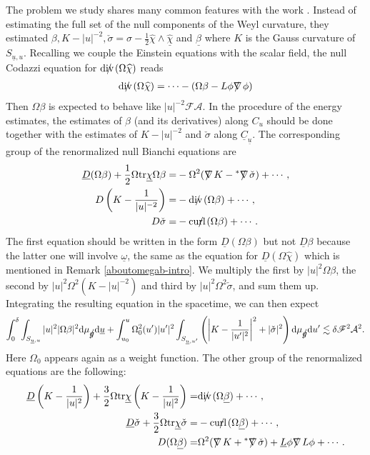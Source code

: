 \documentclass[11pt,reqno]{amsart}
\theoremstyle{definition}
\numberwithin{equation}{section}
\newcommand{\D}{\mathrm{d}}
\newcommand{\tr}{\mathrm{tr}}
\def\betab{\underline{\beta}}
\def\chib{\underline{\chi}}
\def\chibh{\widehat{\underline{\chi}}}
\def\chih{\widehat{\chi}}
\def\Lb{\underline{L}}
\def\tr{\mathrm{tr}}
\def\omegab{\underline{\omega}}
\def\ub{\underline{u}}
\def\Cb{\underline{C}}
\newcommand{\Db}{\underline{D}}
\def\nablas{\mbox{$\nabla \mkern -13mu /$ }}
\def\divs{\mbox{$\mathrm{div} \mkern -13mu /$ }}
\def\curls{\mbox{$\mathrm{curl} \mkern -13mu /$ }}
\def\gs{\mbox{$g \mkern -9mu /$}}
\begin{document}
The problem we study shares many common features with the work \cite{An-Luk}. Instead of estimating the full set of the null components of the Weyl curvature, they estimated $\beta, K-|u|^{-2}, \check{\sigma}=\sigma-\frac{1}{2}\chih\wedge\chibh$ and $\betab$ where $K$ is the Gauss curvature of $S_{\ub,u}$. Recalling we couple the Einstein equations with the scalar field, the null Codazzi equation for $\divs(\Omega\chih)$ reads
\begin{align*}
\divs(\Omega\chih)=\cdots-(\Omega\beta-L\phi\nablas\phi)
\end{align*}
Then $\Omega\beta$ is expected to behave like $|u|^{-2}\mathscr{F}\mathcal{A}$. In the procedure of the energy estimates, the estimates of $\beta$ (and its derivatives) along $C_u$ should be done together with the estimates of $K-|u|^{-2}$ and $\check{\sigma}$ along $\Cb_{\ub}$. The corresponding group of the renormalized null Bianchi equations are
\begin{align*}
\Db(\Omega\beta)+\frac{1}{2}\Omega\tr\chib\Omega\beta=&-\Omega^2(\nablas K-{}^*\nablas\check{\sigma})+\cdots,\\
D\left(K-\frac{1}{|u|^{-2}}\right)=&-\divs(\Omega\beta)+\cdots,\\
D\check{\sigma}=&-\curls(\Omega\beta)+\cdots.
\end{align*}
The first equation should be written in the form $\Db(\Omega\beta)$ but not $\Db\beta$ because the latter one will involve $\omegab$, the same as the equation for $\Db(\Omega\chih)$ which is mentioned in Remark \ref{aboutomegab-intro}. We multiply the first by $|u|^2\Omega\beta$, the second by $|u|^2\Omega^2(K-|u|^{-2})$ and third by $|u|^2\Omega^2\check{\sigma}$, and sum them up. Integrating the resulting equation in the spacetime, we can then expect
\begin{align*}
\int_0^\delta\int_{S_{\ub,u}}|u|^2|\Omega\beta|^2\D\mu_{\gs}\D\ub+\int_{u_0}^u\Omega_0^2(u')|u'|^2\int_{S_{\ub,u'}}\left(\left|K-\frac{1}{|u'|^2}\right|^2+|\check{\sigma}|^2\right)\D\mu_{\gs}\D u'\lesssim\delta\mathscr{F}^2\mathcal{A}^2.
\end{align*}
Here $\Omega_0$ appears again as a weight function. The other group of the renormalized equations are the following:
\begin{align*}
\Db\left(K-\frac{1}{|u|^{2}}\right)+\frac{3}{2}\Omega\tr\chib\left(K-\frac{1}{|u|^{2}}\right)=&\divs(\Omega\betab)+\cdots,\\
\Db\check{\sigma}+\frac{3}{2}\Omega\tr\chib\check{\sigma}=&-\curls(\Omega\betab)+\cdots,\\
D(\Omega\betab)=&\Omega^2(\nablas K+{}^*\nablas\check{\sigma})+\Lb\phi\nablas L\phi+\cdots.
\end{align*}
\end{document}
